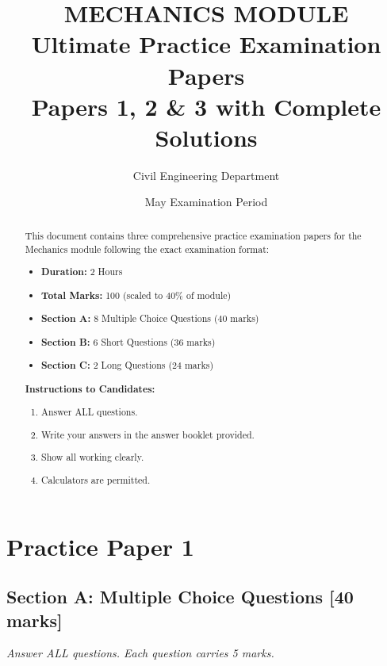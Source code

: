 \documentclass[12pt,a4paper]{article}
\title{\vspace{-1.5cm}\textbf{\Huge\color{examblue} MECHANICS MODULE}\\[0.5cm]
\Large Ultimate Practice Examination Papers\\[0.3cm]
\normalsize Papers 1, 2 \& 3 with Complete Solutions}
\author{Civil Engineering Department}
\date{May Examination Period}
\begin{document}
\maketitle
\thispagestyle{empty}

\begin{abstract}
\noindent This document contains three comprehensive practice examination papers for the Mechanics module following the exact examination format:
\begin{itemize}
    \item \textbf{Duration:} 2 Hours
    \item \textbf{Total Marks:} 100 (scaled to 40\% of module)
    \item \textbf{Section A:} 8 Multiple Choice Questions (40 marks)
    \item \textbf{Section B:} 6 Short Questions (36 marks)
    \item \textbf{Section C:} 2 Long Questions (24 marks)
\end{itemize}
\vspace{0.5cm}

\noindent\textbf{Instructions to Candidates:}
\begin{enumerate}
    \item Answer ALL questions.
    \item Write your answers in the answer booklet provided.
    \item Show all working clearly.
    \item Calculators are permitted.
\end{enumerate}
\end{abstract}

\newpage
\tableofcontents
\newpage

\section*{Practice Paper 1}

\subsection*{Section A: Multiple Choice Questions [40 marks]}
\textit{Answer ALL questions. Each question carries 5 marks.}
\end{document}
